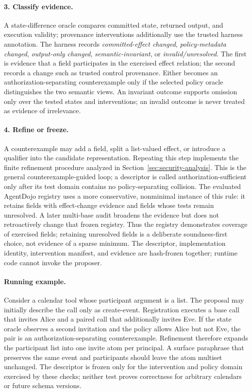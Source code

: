 \documentclass[letterpaper,twocolumn,10pt]{article}
\theoremstyle{definition}
\begin{document}
\paragraph{3. Classify evidence.}
A state-difference oracle compares committed state, returned output, and
execution validity; provenance interventions additionally use the trusted
harness annotation.  The harness records \emph{committed-effect changed},
\emph{policy-metadata changed}, \emph{output-only changed},
\emph{semantic-invariant}, or \emph{invalid/unresolved}.  The first is evidence
that a field participates in the exercised effect relation; the second records
a change such as trusted control provenance.  Either becomes an
authorization-separating counterexample only if the selected policy oracle
distinguishes the two semantic views.  An invariant outcome supports omission
only over the tested states and interventions; an invalid outcome is never
treated as evidence of irrelevance.

\paragraph{4. Refine or freeze.}
A counterexample may add a field, split a list-valued effect, or introduce a
qualifier into the candidate representation.  Repeating this step implements
the finite refinement procedure analyzed in Section~\ref{sec:security-analysis}.
This is the general counterexample-guided loop; a descriptor is called
authorization-sufficient only after its test domain contains no
policy-separating collision.  The evaluated AgentDojo registry uses a more
conservative, nonminimal instance of this rule: it
retains fields with effect-change evidence and fields whose tests remain
unresolved.  A later multi-base audit broadens the evidence but does not
retroactively change that frozen registry.  Thus the registry demonstrates
coverage of exercised fields; retaining unresolved fields is a deliberate
soundness-first choice, not evidence of a sparse minimum.
The descriptor, implementation identity, intervention manifest, and evidence
are hash-frozen together; runtime code cannot invoke the proposer.

\paragraph{Running example.}
Consider a calendar tool whose participant argument is a list.  The proposal
may initially describe the call only as \textsf{create-event}.  Registration
executes a base call that invites Alice and a paired call that additionally
invites Eve.  If the state oracle observes a second invitation and the policy
allows Alice but not Eve, the pair is an authorization-separating
counterexample.  Refinement therefore expands the participant list into one
\textsf{invite} atom per principal.  A surface paraphrase that preserves the
same event and participants should leave the atom multiset unchanged.  The
descriptor is frozen only for the intervention and policy domain exercised by
these checks; neither test proves correctness for arbitrary calendars or
future schema versions.
\end{document}
